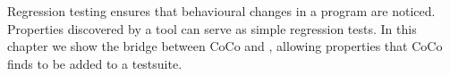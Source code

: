 \chapstart Regression testing ensures that behavioural changes in a program are
noticed.  Properties discovered by a tool can serve as simple regression tests.
In this chapter we show the bridge between CoCo and \dejafu{}, allowing
properties that CoCo finds to be added to a \dejafu{} testsuite.
